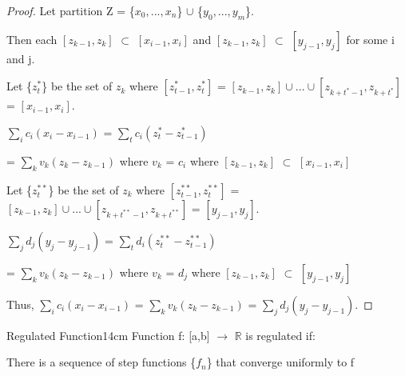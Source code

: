     \begin{proof}
        Let partition Z = \{$x_0,...,x_n$\} $\cup$ \{$y_0,...,y_m$\}.

        Then each $[z_{k-1},z_k]$ $\subset$ $[x_{i-1},x_i]$
        and $[z_{k-1},z_k]$ $\subset$ $[y_{j-1},y_j]$ for some i and j.

        Let \{$z_t^*$\} be the set of $z_k$
        where $[z_{t-1}^*,z_t^*]$
        = $[z_{k-1},z_k] \cup ... \cup [z_{k+t^*-1},z_{k+t^*}]$
        = $[x_{i-1},x_i]$.

        \hspace{0.5cm}
        $\sum_i c_i(x_i - x_{i-1})$
        = $\sum_t c_i(z_t^* - z_{t-1}^*)$
    
        \hspace{0.5cm}
        = $\sum_k v_k(z_k - z_{k-1})$
        \hspace{1cm}
        where $v_k$ = $c_i$ where $[z_{k-1},z_k]$ $\subset$ $[x_{i-1},x_i]$

        Let \{$z_t^{**}$\} be the set of $z_k$
        where $[z_{t-1}^{**},z_t^{**}]$
        = $[z_{k-1},z_k] \cup ... \cup [z_{k+t^{**}-1},z_{k+t^{**}}]$
        = $[y_{j-1},y_j]$.

        \hspace{0.5cm}
        $\sum_j d_j(y_j - y_{j-1})$
        = $\sum_t d_i(z_t^{**} - z_{t-1}^{**})$
    
        \hspace{0.5cm}
        = $\sum_k v_k(z_k - z_{k-1})$
        \hspace{1cm}
        where $v_k$ = $d_j$ where $[z_{k-1},z_k]$ $\subset$ $[y_{j-1},y_j]$

        Thus,
        $\sum_i c_i(x_i - x_{i-1})$
        = $\sum_k v_k(z_k - z_{k-1})$
        = $\sum_j d_j(y_j - y_{j-1})$.
    \end{proof}

    \vspace{0.5cm}



    \begin{definition}{Regulated Function}{14cm}
        Function f: [a,b] $\rightarrow$ $\mathbb{R}$
        is {\color{lblue} regulated} if:
        
        \hspace{0.5cm}
        There is a sequence of step functions \{$f_n$\}
        that converge uniformly to f
    \end{definition}

    \vspace{0.5cm}



